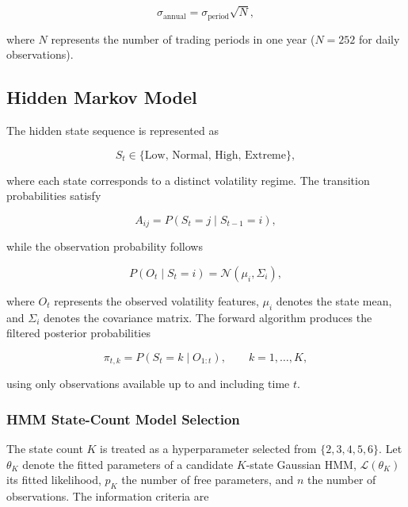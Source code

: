 \documentclass[journal]{IEEEtran}
\begin{document}
\begin{equation}
\sigma_{\mathrm{annual}} = \sigma_{\mathrm{period}}\sqrt{N},
\end{equation}

where $N$ represents the number of trading periods in one year
($N=252$ for daily observations).

\subsection{Hidden Markov Model}

The hidden state sequence is represented as

\begin{equation}
S_t \in \{\text{Low},\,\text{Normal},\,\text{High},\,\text{Extreme}\},
\end{equation}

where each state corresponds to a distinct volatility regime. The
transition probabilities satisfy

\begin{equation}
A_{ij} = P(S_t=j\mid S_{t-1}=i),
\end{equation}

while the observation probability follows

\begin{equation}
P(O_t\mid S_t=i) = \mathcal{N}(\mu_i,\Sigma_i),
\end{equation}

where $O_t$ represents the observed volatility features, $\mu_i$
denotes the state mean, and $\Sigma_i$ denotes the covariance matrix.
The forward algorithm produces the filtered posterior probabilities

\begin{equation}
\label{eq:filtered_regime_posterior}
\pi_{t,k}=P(S_t=k\mid O_{1:t}),\qquad k=1,\ldots,K,
\end{equation}

using only observations available up to and including time $t$.

\subsubsection{HMM State-Count Model Selection}

The state count $K$ is treated as a hyperparameter selected from
$\{2,3,4,5,6\}$. Let $\theta_K$ denote the fitted parameters of a
candidate $K$-state Gaussian HMM, $\mathcal{L}(\theta_K)$ its fitted
likelihood, $p_K$ the number of free parameters, and $n$ the number
of observations. The information criteria are
\end{document}
